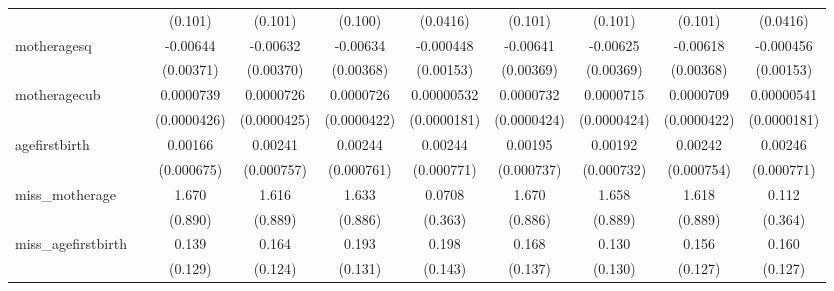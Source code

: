\begin{table}[htbp]
\begin{tabular}{l*{9}{c}}
            &                     &     (0.101)         &     (0.101)         &     (0.100)         &    (0.0416)         &     (0.101)         &     (0.101)         &     (0.101)         &    (0.0416)         \\
[1em]
motheragesq &                     &    -0.00644\sym{*}  &    -0.00632\sym{*}  &    -0.00634\sym{*}  &   -0.000448         &    -0.00641\sym{*}  &    -0.00625\sym{*}  &    -0.00618\sym{*}  &   -0.000456         \\
            &                     &   (0.00371)         &   (0.00370)         &   (0.00368)         &   (0.00153)         &   (0.00369)         &   (0.00369)         &   (0.00368)         &   (0.00153)         \\
[1em]
motheragecub&                     &   0.0000739\sym{*}  &   0.0000726\sym{*}  &   0.0000726\sym{*}  &  0.00000532         &   0.0000732\sym{*}  &   0.0000715\sym{*}  &   0.0000709\sym{*}  &  0.00000541         \\
            &                     & (0.0000426)         & (0.0000425)         & (0.0000422)         & (0.0000181)         & (0.0000424)         & (0.0000424)         & (0.0000422)         & (0.0000181)         \\
[1em]
agefirstbirth&                     &     0.00166\sym{**} &     0.00241\sym{***}&     0.00244\sym{***}&     0.00244\sym{***}&     0.00195\sym{***}&     0.00192\sym{***}&     0.00242\sym{***}&     0.00246\sym{***}\\
            &                     &  (0.000675)         &  (0.000757)         &  (0.000761)         &  (0.000771)         &  (0.000737)         &  (0.000732)         &  (0.000754)         &  (0.000771)         \\
[1em]
miss\_motherage&                     &       1.670\sym{*}  &       1.616\sym{*}  &       1.633\sym{*}  &      0.0708         &       1.670\sym{*}  &       1.658\sym{*}  &       1.618\sym{*}  &       0.112         \\
            &                     &     (0.890)         &     (0.889)         &     (0.886)         &     (0.363)         &     (0.886)         &     (0.889)         &     (0.889)         &     (0.364)         \\
[1em]
miss\_agefirstbirth&                     &       0.139         &       0.164         &       0.193         &       0.198         &       0.168         &       0.130         &       0.156         &       0.160         \\
            &                     &     (0.129)         &     (0.124)         &     (0.131)         &     (0.143)         &     (0.137)         &     (0.130)         &     (0.127)         &     (0.127)         \\

\end{tabular}
\end{table}
